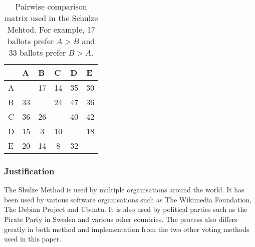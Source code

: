 \begin{table}[H]
\centering
\begin{tabular}{l|c|c|c|c|c|}
\cline{2-6}
 & \multicolumn{1}{l|}{A} & \multicolumn{1}{l|}{B} & \multicolumn{1}{l|}{C} & \multicolumn{1}{l|}{D} & \multicolumn{1}{l|}{E} \\ \hline
\multicolumn{1}{|l|}{A} & \cellcolor[HTML]{9B9B9B} & \cellcolor[HTML]{FFDDDD}17 & \cellcolor[HTML]{FFDDDD}14 & \cellcolor[HTML]{DDFFDD}35 & \cellcolor[HTML]{DDFFDD}30 \\ \hline
\multicolumn{1}{|l|}{B} & \cellcolor[HTML]{DDFFDD}33 & \cellcolor[HTML]{9B9B9B} & \cellcolor[HTML]{FFDDDD}24 & \cellcolor[HTML]{DDFFDD}47 & \cellcolor[HTML]{DDFFDD}36 \\ \hline
\multicolumn{1}{|l|}{C} & \cellcolor[HTML]{DDFFDD}36 & \cellcolor[HTML]{DDFFDD}26 & \cellcolor[HTML]{9B9B9B} & \cellcolor[HTML]{DDFFDD}40 & \cellcolor[HTML]{DDFFDD}42 \\ \hline
\multicolumn{1}{|l|}{D} & \cellcolor[HTML]{FFDDDD}15 & \cellcolor[HTML]{FFDDDD}3 & \cellcolor[HTML]{FFDDDD}10 & \cellcolor[HTML]{9B9B9B} & \cellcolor[HTML]{FFDDDD}18 \\ \hline
\multicolumn{1}{|l|}{E} & \cellcolor[HTML]{FFDDDD}20 & \cellcolor[HTML]{FFDDDD}14 & \cellcolor[HTML]{FFDDDD}8 & \cellcolor[HTML]{DDFFDD}32 & \cellcolor[HTML]{9B9B9B} \\ \hline
\end{tabular}
\caption{Pairwise comparison matrix used in the Schulze Mehtod. For example, 17 ballots prefer $A>B$ and 33 ballots prefer $B>A$.}
\label{Pairwise comparison matrix}
\end{table}
\subsubsection{Justification}
The Shulze Method is used by multiple organisations around the world. It has been used by various software organisations such as The Wikimedia Foundation, The Debian Project and Ubuntu. It is also used by political parties such as the Pirate Party in Sweden and various other countries. The process also differs greatly in both method and implementation from the two other voting methods used in this paper.
